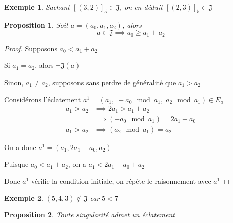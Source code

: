 \documentclass{article}
\newtheorem{proposition}{Proposition}
\newtheorem{exemple}{Exemple}
\begin{document}
\begin{exemple}
    Sachant $[(3, 2)]_5 \in \mathfrak{J}$, on en déduit $[(2, 3)]_5 \in \mathfrak{J}$
\end{exemple}

\newpage

\begin{proposition}
    Soit $a=(a_0, a_1, a_2)$, alors
    \[ a \in \mathfrak{J} \implies a_0 \geq a_1 + a_2 \]
\end{proposition}

\begin{proof}
    Supposons $a_0 < a_1 + a_2$

    Si $a_1 = a_2$, alors $\neg \mathfrak{J}(a)$

    Sinon, $a_1 \neq a_2$, supposons sans perdre de généralité que $a_1 > a_2$

    Considérons l'éclatement $a^1 = (a_1,\; -a_0 \mod a_1,\; a_2 \mod a_1) \in E_a$
    \begin{align*}
        a_1 > a_2 & \implies 2a_1 > a_1+a_2               \\
                  & \implies (-a_0 \mod a_1) = 2a_1 - a_0 \\
        a_1 > a_2 & \implies (a_2 \mod a_1) = a_2
    \end{align*}

    On a donc $a^1 = (a_1, 2a_1-a_0, a_2)$

    Puisque $a_0 < a_1 + a_2$, on a $a_1 < 2a_1 - a_0 + a_2$

    Donc $a^1$ vérifie la condition initiale, on répète le raisonnement avec $a^1$
\end{proof}

\begin{exemple}
    $(5, 4, 3) \not \in \mathfrak{J}$ car $5 < 7$
\end{exemple}

\begin{proposition}
    Toute singularité admet un éclatement
\end{proposition}
\end{document}

